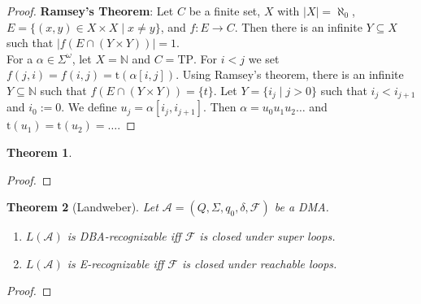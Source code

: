 \documentclass{article}
\newtheorem{theorem}{Theorem}
\begin{document}
\begin{proof}
	\textbf{Ramsey's Theorem}: Let $C$ be a finite set, $X$ with $|X| = \aleph_0$, $E = \{ (x, y) \in X \times X \mid x \neq y\}$, and $f : E \rightarrow C$. Then there is an infinite $Y \subseteq X$ such that $|f(E \cap (Y \times Y))| = 1$. \\
	
	For a $\alpha \in \Sigma^\omega$, let $X = \mathbb{N}$ and $C = \text{TP}$. For $i < j$ we set $f(j, i) = f(i, j) = \text{t}(\alpha[i, j])$. Using Ramsey's theorem,  there is an infinite $Y \subseteq \mathbb{N}$ such that $f(E \cap (Y \times Y)) = \{t\}$. Let $Y = \{i_j \mid j > 0 \}$ such that $i_j < i_{j+1}$ and $i_0 := 0$. We define $u_j = \alpha[i_j, i_{j+1}]$. Then $\alpha = u_0 u_1 u_2 \dots$ and $\text{t}(u_1) = \text{t}(u_2) = \dots$.
\end{proof}


\vspace{1cm}
\begin{theorem}
\label{ltl_to_nba}

\end{theorem}
\begin{proof}
\end{proof}


\vspace{1cm}
\begin{theorem}[Landweber]
\label{landweber}
	Let $\mathcal{A} = (Q, \Sigma, q_0, \delta, \mathcal{F})$ be a DMA. 
	\begin{enumerate}
		\item $L(\mathcal{A})$ is DBA-recognizable iff $\mathcal{F}$ is closed under super loops.
		\item $L(\mathcal{A})$ is E-recognizable iff $\mathcal{F}$ is closed under reachable loops.
	\end{enumerate}
\end{theorem}
\begin{proof}
\end{proof}
\end{document}
